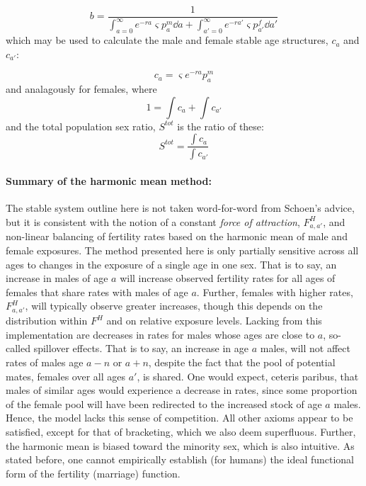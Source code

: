 \begin{equation}
b = \frac{1}{\int_{a = 0}^\infty e^{-ra} \varsigma p_a^m \dd a + \int_{a' =
0}^\infty e^{-ra'} \varsigma p_{a'}^f \dd a'}
\end{equation}
which may be used to calculate the male and female stable age structures, $c_a$
and $c_{a'}$:

\begin{equation}
c_a =  \varsigma  e^{-ra} p_a^m
\end{equation}
and analagously for females, where
\begin{equation}
1 = \int c_a + \int c_{a'}
\end{equation}
and the total population sex ratio, $S^{tot}$ is the ratio of these:
\begin{equation}
S^{tot} = \frac{\int c_a}{\int c_{a'}}
\end{equation}

\paragraph{Summary of the harmonic mean method: } The stable system outline here
is not taken word-for-word from Schoen's advice, but it is consistent with the 
notion of a constant \textit{force of attraction},
$F_{a,a'}^H$, and non-linear balancing of fertility rates based on the harmonic
mean of male and female exposures. The method presented here is only partially
sensitive across all ages to changes in the exposure of a single age in one sex.
That is to say, an increase in males of age $a$ will increase observed fertility rates for all ages
of females that share rates with males of age $a$. Further, females with
higher rates, $F_{a,a'}^H$, will typically observe greater increases, though this
depends on the distribution within $F^H$ and on relative exposure levels.
Lacking from this implementation are decreases in rates for males whose ages are close
to $a$, so-called spillover effects\citep{choo2006estimating}. That is to say,
an increase in age $a$ males, will not affect rates of males age $a-n$ or $a+n$, 
despite the fact that the pool of potential mates, females over
all ages $a'$, is shared. One would expect, ceteris paribus, that males of
similar ages would experience a decrease in rates, since some proportion of the
female pool will have been redirected to the increased stock of age $a$ males.
Hence, the model lacks this sense of competition. All other axioms appear to be
satisfied, except for that of bracketing, which we also deem superfluous.
Further, the harmonic mean is biased toward the minority sex, which is also intuitive.
 As stated before, one cannot empirically establish (for
humans) the ideal functional form of the fertility (marriage) function.

